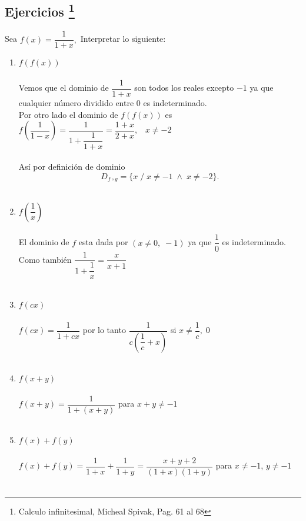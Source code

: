 \subsection[Ejercicios]{Ejercicios \footnote{Calculo infinitesimal, Micheal Spivak, Pag. 61 al 68}}
\begin{ej}Sea $f(x)=\dfrac{1}{1+x},$ Interpretar lo siguiente:
\begin{enumerate}[\bfseries i)]
\item $f\left( f(x) \right)$\\\\
Vemos que el dominio de    $\dfrac{1}{1+x}$ son todos los reales excepto $-1$ ya que cualquier número dividido entre $0$ es indeterminado.\\
Por otro lado el dominio de $f\left( f(x) \right)$ es $f \left( \dfrac{1}{1 - x} \right) = \dfrac{1}{1 + \dfrac{1}{1+x}} = \dfrac{1+x}{2+x}, \; \; \; x \neq -2$\\\\
Así por definición de dominio $$D_{f \circ g} = \lbrace x \;  / \; x \neq -1 \; \land \; x \neq -2  \rbrace.$$\\

\item $f \left( \dfrac{1}{x} \right)$\\\\
El dominio de $f$ esta dada por $ (x\neq 0, \; -1)$ ya que $\dfrac{1}{0}$ es indeterminado. Como también $\dfrac{1}{1 + \dfrac{1}{x}} = \dfrac{x}{x+1}$\\\\ 

\item $f(cx)$\\\\
$f(cx)=\dfrac{1}{1+cx}$ por lo tanto $\dfrac{1}{c\left( \dfrac{1}{c}+x \right)}$ \; si \; $x\neq \dfrac{1}{c}, \; 0$\\\\

\item $f(x+y)$\\\\
$f(x+y)=\dfrac{1}{1+(x+y)}$ para $x+y \neq -1$\\\\

\item $f(x)+ f(y)$\\\\
$f(x)+ f(y) = \dfrac{1}{1+x} + \dfrac{1}{1+y} = \dfrac{x+y+2}{(1+x)(1+y)}$ para $x\neq -1$, $y\neq -1$\\\\


\end{enumerate}
\end{ej}

